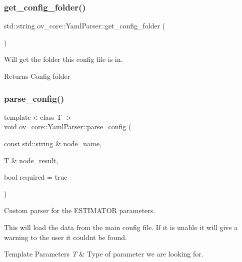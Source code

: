 \subsubsection{\texorpdfstring{get\+\_\+config\+\_\+folder()}{get\_config\_folder()}}
{\footnotesize\ttfamily std\+::string ov\+\_\+core\+::\+Yaml\+Parser\+::get\+\_\+config\+\_\+folder (\begin{DoxyParamCaption}{ }\end{DoxyParamCaption})\hspace{0.3cm}{\ttfamily [inline]}}



Will get the folder this config file is in. 

\begin{DoxyReturn}{Returns}
Config folder 
\end{DoxyReturn}
\mbox{\label{classov__core_1_1YamlParser_aff9bc745ae8097ece9807ec4d0fbec2f}} 
\subsubsection{\texorpdfstring{parse\+\_\+config()}{parse\_config()}}
{\footnotesize\ttfamily template$<$class T $>$ \\
void ov\+\_\+core\+::\+Yaml\+Parser\+::parse\+\_\+config (\begin{DoxyParamCaption}\item[{const std\+::string \&}]{node\+\_\+name,  }\item[{T \&}]{node\+\_\+result,  }\item[{bool}]{required = {\ttfamily true} }\end{DoxyParamCaption})\hspace{0.3cm}{\ttfamily [inline]}}



Custom parser for the E\+S\+T\+I\+M\+A\+T\+OR parameters. 

This will load the data from the main config file. If it is unable it will give a warning to the user it couldn\textquotesingle{}t be found.


\begin{DoxyTemplParams}{Template Parameters}
{\em T} & Type of parameter we are looking for. \\
\hline
\end{DoxyTemplParams}

